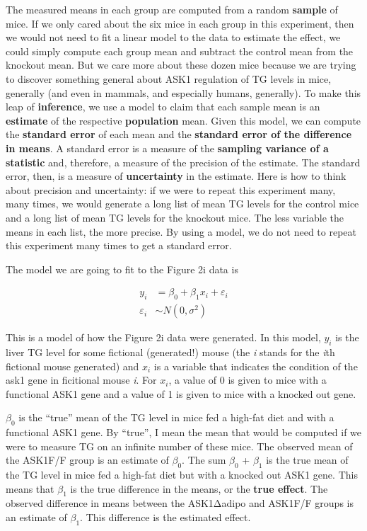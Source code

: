 \documentclass[]{book}
\begin{document}
The measured means in each group are computed from a random \textbf{sample} of mice. If we only cared about the six mice in each group in this experiment, then we would not need to fit a linear model to the data to estimate the effect, we could simply compute each group mean and subtract the control mean from the knockout mean. But we care more about these dozen mice because we are trying to discover something general about ASK1 regulation of TG levels in mice, generally (and even in mammals, and especially humans, generally). To make this leap of \textbf{inference}, we use a model to claim that each sample mean is an \textbf{estimate} of the respective \textbf{population} mean. Given this model, we can compute the \textbf{standard error} of each mean and the \textbf{standard error of the difference in means}. A standard error is a measure of the \textbf{sampling variance of a statistic} and, therefore, a measure of the precision of the estimate. The standard error, then, is a measure of \textbf{uncertainty} in the estimate. Here is how to think about precision and uncertainty: if we were to repeat this experiment many, many times, we would generate a long list of mean TG levels for the control mice and a long list of mean TG levels for the knockout mice. The less variable the means in each list, the more precise. By using a model, we do not need to repeat this experiment many times to get a standard error.

The model we are going to fit to the Figure 2i data is

\begin{align}
y_i &= \beta_0 + \beta_1 x_i + \varepsilon_i\\
\varepsilon_i &\sim N(0, \sigma^2)
\end{align}

This is a model of how the Figure 2i data were generated. In this model, \(y_i\) is the liver TG level for some fictional (generated!) mouse (the \emph{i} stands for the \emph{i}th fictional mouse generated) and \(x_i\) is a variable that indicates the condition of the ask1 gene in ficitional mouse \emph{i}. For \(x_i\), a value of 0 is given to mice with a functional ASK1 gene and a value of 1 is given to mice with a knocked out gene.

\(\beta_0\) is the ``true'' mean of the TG level in mice fed a high-fat diet and with a functional ASK1 gene. By ``true'', I mean the mean that would be computed if we were to measure TG on an infinite number of these mice. The observed mean of the ASK1F/F group is an estimate of \(\beta_0\). The sum \(\beta_0\) + \(\beta_1\) is the true mean of the TG level in mice fed a high-fat diet but with a knocked out ASK1 gene. This means that \(\beta_1\) is the true difference in the means, or the \textbf{true effect}. The observed difference in means between the ASK1Δadipo and ASK1F/F groups is an estimate of \(\beta_1\). This difference is the estimated effect.
\end{document}
